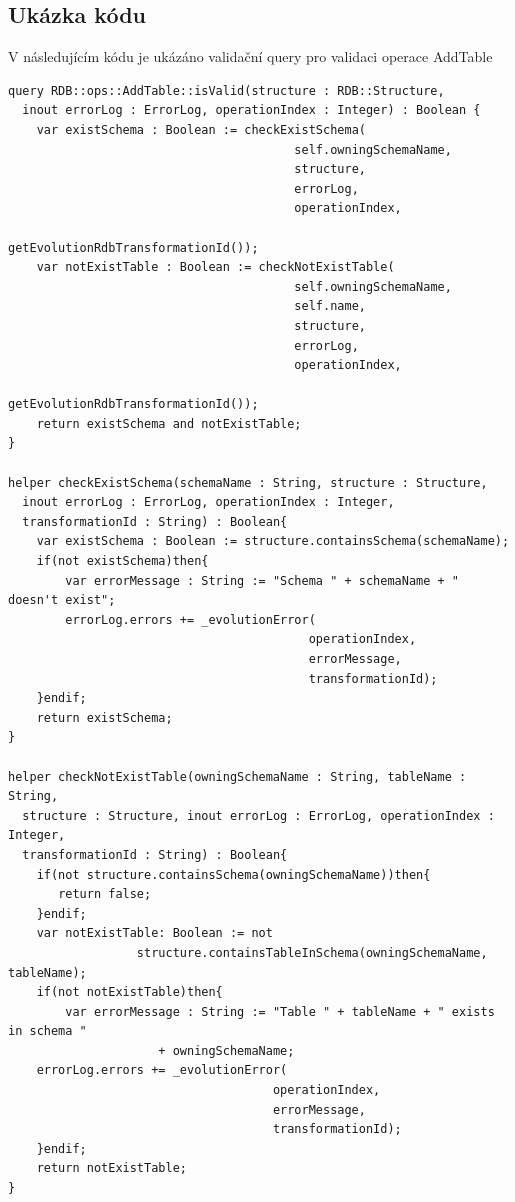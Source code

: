\documentclass[11pt,twoside,a4paper]{book}
\begin{document}
\subsection{Ukázka kódu}
V následujícím kódu je ukázáno validační query pro validaci operace AddTable
\begin{verbatim}
query RDB::ops::AddTable::isValid(structure : RDB::Structure, 
  inout errorLog : ErrorLog, operationIndex : Integer) : Boolean {
    var existSchema : Boolean := checkExistSchema(
                                        self.owningSchemaName, 
                                        structure, 
                                        errorLog, 
                                        operationIndex, 
                                        getEvolutionRdbTransformationId());
    var notExistTable : Boolean := checkNotExistTable(
                                        self.owningSchemaName, 
                                        self.name, 
                                        structure, 
                                        errorLog, 
                                        operationIndex, 
                                        getEvolutionRdbTransformationId());
    return existSchema and notExistTable;
}

helper checkExistSchema(schemaName : String, structure : Structure, 
  inout errorLog : ErrorLog, operationIndex : Integer, 
  transformationId : String) : Boolean{ 
    var existSchema : Boolean := structure.containsSchema(schemaName);
    if(not existSchema)then{
        var errorMessage : String := "Schema " + schemaName + " doesn't exist";
        errorLog.errors += _evolutionError(
                                          operationIndex, 
                                          errorMessage,
                                          transformationId); 
    }endif;
    return existSchema;	
}

helper checkNotExistTable(owningSchemaName : String, tableName : String, 
  structure : Structure, inout errorLog : ErrorLog, operationIndex : Integer,
  transformationId : String) : Boolean{ 
    if(not structure.containsSchema(owningSchemaName))then{
       return false;
    }endif;
    var notExistTable: Boolean := not
                  structure.containsTableInSchema(owningSchemaName, tableName); 
    if(not notExistTable)then{ 
        var errorMessage : String := "Table " + tableName + " exists in schema "
                     + owningSchemaName;
    errorLog.errors += _evolutionError(
                                     operationIndex, 
                                     errorMessage,
                                     transformationId); 
    }endif;
	return notExistTable;
}
\end{verbatim}
\end{document}
